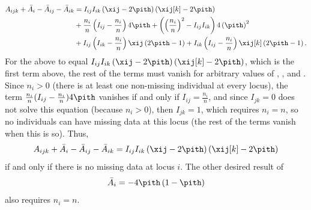 \documentclass[11pt]{article}
\begin{document}
\begin{appendices}
  \begin{align*}
    A_{ijk} + \bar{A}_i - \bar{A}_{ij}  - \bar{A}_{ik}
    &=
      I_{ij} I_{ik} \left( \xij - 2 \pith \right) \left( \xij[k] - 2 \pith \right)
    \\
      &+ \frac{n_i}{n} \left( I_{ij} - \frac{n_i}{n} \right) 4 \pith
        + \left( \left( \frac{n_i}{n} \right)^2 -  I_{ij} I_{ik} \right) 4 \left( \pith \right)^2
    \\
      &+ I_{ij} \left( I_{ik} - \frac{n_i}{n} \right) \xij \left( 2 \pith - 1 \right)
      + I_{ik} \left( I_{ij} - \frac{n_i}{n} \right) \xij[k] \left( 2 \pith - 1 \right)
      .
  \end{align*}
  For the above to equal $I_{ij} I_{ik} \left( \xij - 2 \pith \right) \left( \xij[k] - 2 \pith \right)$, which is the first term above, the rest of the terms must vanish for arbitrary values of \pith, \xij, and \xij[k].
  Since $n_i > 0$ (there is at least one non-missing individual at every locus), the term $\frac{n_i}{n} ( I_{ij} - \frac{n_i}{n} ) 4 \pith$ vanishes if and only if $I_{ij} = \frac{n_i}{n}$, and since $I_{jk}=0$ does not solve this equation (because $n_i > 0$), then $I_{jk}=1$, which requires $n_i=n$, so no individuals can have missing data at this locus (the rest of the terms vanish when this is so).
  Thus,
  $$
  A_{ijk} + \bar{A}_i - \bar{A}_{ij}  - \bar{A}_{ik}
  =
  I_{ij} I_{ik} \left( \xij - 2 \pith \right) \left( \xij[k] - 2 \pith \right)
  $$
  if and only if there is no missing data at locus $i$.
  The other desired result of
  $$
  \bar{A}_i
  =
  - 4 \pith \left( 1 - \pith \right)
  $$
  also requires $n_i = n$.


\end{appendices}
\end{document}
